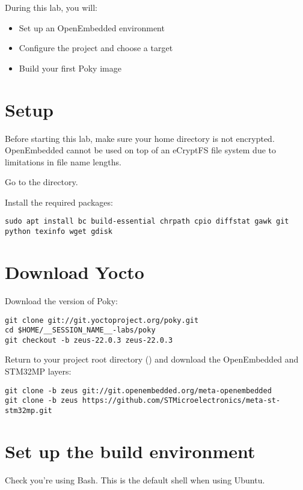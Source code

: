 
During this lab, you will:
\begin{itemize}
  \item Set up an OpenEmbedded environment
  \item Configure the project and choose a target
  \item Build your first Poky image
\end{itemize}

\section{Setup}

Before starting this lab, make sure your home directory is not
encrypted. OpenEmbedded cannot be used on top of an eCryptFS file
system due to limitations in file name lengths.

Go to the  directory.

Install the required packages:
\begin{verbatim}
sudo apt install bc build-essential chrpath cpio diffstat gawk git python texinfo wget gdisk
\end{verbatim}

\section{Download Yocto}

Download the  version of Poky:
\begin{verbatim}
git clone git://git.yoctoproject.org/poky.git
cd $HOME/__SESSION_NAME__-labs/poky
git checkout -b zeus-22.0.3 zeus-22.0.3
\end{verbatim}

Return to your project root directory ()
and download the OpenEmbedded and STM32MP layers:
\begin{verbatim}
git clone -b zeus git://git.openembedded.org/meta-openembedded
git clone -b zeus https://github.com/STMicroelectronics/meta-st-stm32mp.git
\end{verbatim}

\section{Set up the build environment}

Check you're using Bash. This is the default shell when using Ubuntu.


